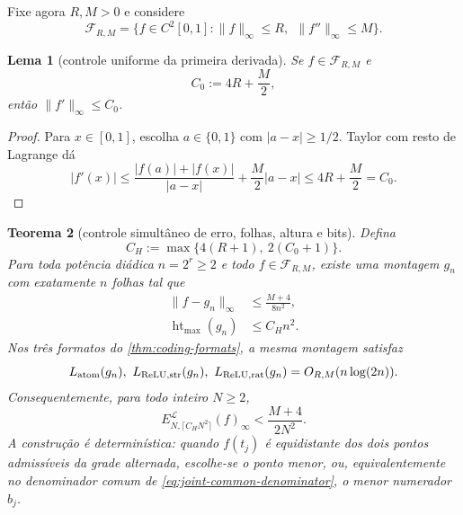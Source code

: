 \documentclass[11pt,a4paper]{article}
\newtheorem{theorem}{Teorema}[section]
\newtheorem{lemma}[theorem]{Lema}
\theoremstyle{definition}
\theoremstyle{remark}
\newcommand{\Library}{\mathcal{L}}
\newcommand{\height}{\operatorname{ht}}
\begin{document}
Fixe agora $R,M>0$ e considere
\begin{equation}
 \mathcal{F}_{R,M}=\{f\in C^2[0,1]:\|f\|_\infty\le R,\
                                  \ \|f''\|_\infty\le M\}.
 \label{eq:function-class}
\end{equation}

\begin{lemma}[controle uniforme da primeira derivada]
\label{lem:derivative-control}
Se $f\in\mathcal F_{R,M}$ e
\begin{equation}
 C_0:=4R+\frac M2,
 \label{eq:derivative-constant}
\end{equation}
então $\|f'\|_\infty\le C_0$.
\end{lemma}

\begin{proof}
Para $x\in[0,1]$, escolha $a\in\{0,1\}$ com $|a-x|\ge1/2$. Taylor com
resto de Lagrange dá
\begin{equation}
 |f'(x)|
 \le\frac{|f(a)|+|f(x)|}{|a-x|}+\frac{M}{2}|a-x|
 \le4R+\frac M2=C_0.
 \label{eq:derivative-control}
\end{equation}
\end{proof}

\begin{theorem}[controle simultâneo de erro, folhas, altura e bits]
\label{thm:joint-budget}
Defina
\begin{equation}
 C_H:=\max\{4(R+1),\ 2(C_0+1)\}.
 \label{eq:joint-height-constant}
\end{equation}
Para toda potência diádica $n=2^r\ge2$ e todo
$f\in\mathcal F_{R,M}$, existe uma montagem $g_n$ com exatamente $n$
folhas tal que
\begin{align}
 \|f-g_n\|_\infty
 &\le\frac{M+4}{8n^2},
 \label{eq:joint-dyadic-error}\\
 \height_{\max}(g_n)&\le C_Hn^2.
 \label{eq:joint-dyadic-height}
\end{align}
Nos três formatos do \cref{thm:coding-formats}, a mesma montagem satisfaz
\begin{equation}
 L_{\rm atom}(g_n),\ L_{\rm ReLU,str}(g_n),\
 L_{\rm ReLU,rat}(g_n)=O_{R,M}(n\log(2n)).
 \label{eq:joint-dyadic-bits}
\end{equation}
Consequentemente, para todo inteiro $N\ge2$,
\begin{equation}
 E_{N,\lceil C_HN^2\rceil}^{\Library}(f)_\infty
 <\frac{M+4}{2N^2}.
 \label{eq:joint-all-N}
\end{equation}
A construção é determinística: quando $f(t_j)$ é equidistante dos dois
pontos admissíveis da grade alternada, escolhe-se o ponto menor, ou,
equivalentemente no denominador comum de \eqref{eq:joint-common-denominator},
o menor numerador $b_j$.
\end{theorem}
\end{document}
